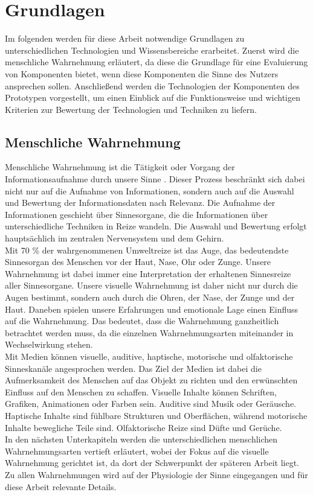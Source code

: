 \chapter{Grundlagen}
\label{cha:Grundlagen}
Im folgenden werden für diese Arbeit notwendige Grundlagen zu unterschiedlichen Technologien und Wissensbereiche erarbeitet. 
Zuerst wird die menschliche Wahrnehmung erläutert, da diese die Grundlage für eine Evaluierung von Komponenten bietet, wenn diese Komponenten die Sinne des Nutzers ansprechen sollen. Anschließend werden die Technologien der Komponenten des Prototypen vorgestellt, um einen Einblick auf die Funktionsweise und wichtigen Kriterien zur Bewertung der Technologien und Techniken zu liefern.
\section{Menschliche Wahrnehmung}
Menschliche Wahrnehmung ist die \glqq Tätigkeit oder Vorgang der Informationsaufnahme durch unsere Sinne\grqq{} \cite[Seite 12]{Buhler.2017}. Dieser Prozess beschränkt sich dabei nicht nur auf die Aufnahme von Informationen, sondern auch auf die Auswahl und Bewertung der Informationsdaten nach Relevanz. Die Aufnahme der Informationen geschieht über Sinnesorgane, die die Informationen über unterschiedliche Techniken in Reize wandeln. Die Auswahl und Bewertung erfolgt hauptsächlich im zentralen Nervensystem und dem Gehirn. \cite[Vgl. Seite 12]{Buhler.2017}\\
Mit 70 \% der wahrgenommenen Umweltreize ist das Auge, das bedeutendste Sinnesorgan des Menschen vor der Haut, Nase, Ohr oder Zunge. Unsere Wahrnehmung ist dabei immer eine Interpretation der erhaltenen Sinnesreize aller Sinnesorgane. Unsere visuelle Wahrnehmung ist daher nicht nur durch die Augen bestimmt, sondern auch durch die Ohren, der Nase, der Zunge und der Haut. Daneben spielen unsere Erfahrungen und emotionale Lage einen Einfluss auf die Wahrnehmung. \cite[Vgl. Seite 13 f.]{Buhler.2017}
Das bedeutet, dass die Wahrnehmung ganzheitlich betrachtet werden muss, da die einzelnen Wahrnehmungsarten miteinander in Wechselwirkung stehen.\\
Mit Medien können visuelle, auditive, haptische, motorische und olfaktorische Sinneskanäle angesprochen werden. Das Ziel der Medien ist dabei die Aufmerksamkeit des Menschen auf das Objekt zu richten und den erwünschten Einfluss auf den Menschen zu schaffen. Visuelle Inhalte können Schriften, Grafiken, Animationen oder Farben sein. Auditive sind Musik oder Geräusche. Haptische Inhalte sind fühlbare Strukturen und Oberflächen, während motorische Inhalte bewegliche Teile sind. Olfaktorische Reize sind Düfte und Gerüche. \cite[Vgl. Seite 3]{Buhler.2017}\\
In den nächsten Unterkapiteln werden die unterschiedlichen menschlichen Wahrnehmungsarten vertieft erläutert, wobei der Fokus auf die visuelle Wahrnehmung gerichtet ist, da dort der Schwerpunkt der späteren Arbeit liegt. Zu allen Wahrnehmungen wird auf der Physiologie der Sinne eingegangen und für diese Arbeit relevante Details.
